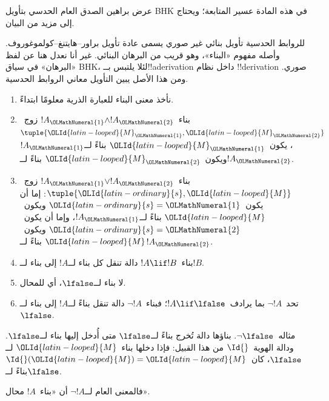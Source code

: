 \documentclass[../../../include/open-logic-section]{subfiles}
\begin{document}


\begin{editorial}
  عرض براهين الصدق العام الحدسي بتأويل BHK في هذه المادة عسير المتابعة؛
  ويحتاج إلى مزيد من البيان.
\end{editorial}

للروابط الحدسية تأويل بنائي غير صوري يسمى عادة تأويل
براور--هايتنغ--كولموغوروف. وأصله مفهوم «البناء»، وهو قريب من البرهان
البنائي. غير أنا نعدل هنا عن لفظ «البرهان» في سياق BHK، لئلا يلتبس
بــ!!a{derivation} داخل نظام !!{derivation} صوري. ومن هذا الأصل يبين
التأويل معاني الروابط الحدسية.

\begin{enumerate}
\item نأخذ معنى البناء للعبارة الذرية معلومًا ابتداءً.
\item بناء~$!A_{\OLMathNumeral{1}} \land !A_{\OLMathNumeral{2}}$ زوج~$\tuple{{\OLId{latin-looped}{M}}_{\OLMathNumeral{1}}, {\OLId{latin-looped}{M}}_{\OLMathNumeral{2}}}$، يكون~${\OLId{latin-looped}{M}}_{\OLMathNumeral{1}}$
  بناءً لــ$!A_{\OLMathNumeral{1}}$ ويكون~${\OLId{latin-looped}{M}}_{\OLMathNumeral{2}}$ بناءً لــ$!A_{\OLMathNumeral{2}}$.
\item بناء~$!A_{\OLMathNumeral{1}} \lor !A_{\OLMathNumeral{2}}$ زوج~$\tuple{{\OLId{latin-ordinary}{s}}, {\OLId{latin-looped}{M}}}$: إما أن يكون~${\OLId{latin-ordinary}{s}}={\OLMathNumeral{1}}$
  ويكون~${\OLId{latin-looped}{M}}$ بناءً لــ$!A_{\OLMathNumeral{1}}$، وإما أن يكون~${\OLId{latin-ordinary}{s}}={\OLMathNumeral{2}}$ ويكون~${\OLId{latin-looped}{M}}$ بناءً لــ$!A_{\OLMathNumeral{2}}$.
\item بناء~$!A \lif !B$ دالة تنقل كل بناء لــ$!A$ إلى بناء لــ$!B$.
\item لا بناء لــ$\lfalse$، أي للمحال.
\item تحد~$\lnot !A$ بما يرادف~$!A \lif \lfalse$؛ فبناء~$\lnot !A$
  دالة تنقل بناءً لــ$!A$ إلى بناء لــ$\lfalse$.
\end{enumerate}

\begin{ex}
مثاله~$\lnot \lfalse$. بناؤها دالة تُخرج بناءً لــ$\lfalse$ متى أُدخل
إليها بناء لــ$\lfalse$. ودالة الهوية~$\Id{}$ من هذا القبيل: فإذا دخلها
بناء~${\OLId{latin-looped}{M}}$ لــ$\lfalse$، كان~$\Id{}({\OLId{latin-looped}{M}}) = {\OLId{latin-looped}{M}}$ بناءً لــ$\lfalse$.
\end{ex}

فالمعنى العام لــ$\lnot !A$ أن «بناء~$!A$ محال».
\end{document}
